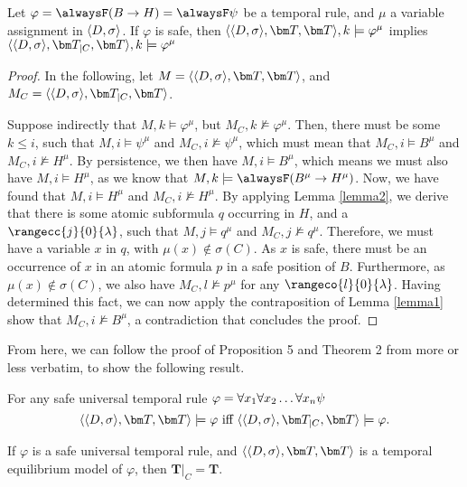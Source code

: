 \begin{lemma}
  Let $\varphi=\alwaysF (B \rightarrow H)=\alwaysF \psi$ be a temporal
  rule, and $\mu$ a variable assignment in $\langle D, \sigma \rangle$. If $\varphi$ is
  safe, then $\qttandt,k \models \varphi^\mu$ implies
  $\qttcandt,k \models \varphi^\mu$
\end{lemma}
\begin{proof}
  In the following, let $M=\qttandt$, and $M_C=\qttcandt$.

  Suppose indirectly that $M,k \models \varphi^\mu$, but
  $M_C,k \not \models \varphi^\mu$. Then, there must be some
  $k\leq i$, such that $M,i \models \psi^\mu$ and
  $M_C,i \not \models \psi^\mu$, which must mean that
  $M_C,i \models B^\mu$ and $M_C,i \not \models H^\mu$. By
  persistence, we then have $M,i \models B^\mu$, which means we must
  also have $M,i \models H^\mu$, as we know that
  $M,k \models \alwaysF(B^\mu \rightarrow H^\mu)$. Now, we have found
  that $M,i \models H^\mu$ and $M_C,i \not \models H^\mu$. By applying
  Lemma \ref{lemma2}, we derive that there is some atomic subformula
  $q$ occurring in $H$, and a $\rangecc{j}{0}{\lambda}$, such that
  $M,j \models q^\mu$ and $M_C,j \not \models q^\mu$. Therefore, we
  must have a variable $x$ in $q$, with $\mu(x) \not \in
  \sigma(C)$. As $x$ is safe, there must be an occurrence of $x$ in an
  atomic formula $p$ in a safe position of $B$. Furthermore, as
  $\mu(x) \not \in \sigma(C)$, we also have $M_C,l \not \models p^\mu$
  for any $\rangeco{l}{0}{\lambda}$. Having determined this fact, we
  can now apply the contraposition of Lemma \ref{lemma1} show that
  $M_C,i \not \models B^\mu$, a contradiction that concludes the
  proof.
\end{proof}

From here, we can follow the proof of Proposition 5 and Theorem 2 from \cite{agcapevidi17a} more
or less verbatim, to show the following result.

\begin{proposition}
  For any safe universal temporal rule $\varphi = \forall x_1 \forall x_2 \dots \forall x_n \psi$
  \begin{equation*} \qttandt \models \varphi \text{ iff } \qttcandt \models \varphi. \end{equation*}
\end{proposition}

\begin{theorem}
  If $\varphi$ is a safe universal temporal rule, and $\qttandt$ is a temporal equilibrium
  model of $\varphi$, then $\bm{T}\vert_{C}=\bm{T}$.
\end{theorem}


